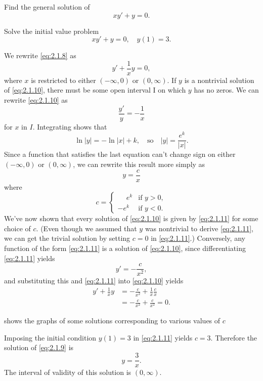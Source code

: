 \begin{example} \label{example:2.1.4}
\begin{alist}
\item %
Find the general solution of
\begin{equation}
 xy'+y=0.\label{eq:2.1.8}
\end{equation}

\item %
Solve the initial value problem
\begin{equation}
 xy'+y=0,\quad y(1)=3.\label{eq:2.1.9}
\end{equation}
\end{alist}
\end{example}


\begin{alistSolution}
\item
We rewrite \eqref{eq:2.1.8} as
\begin{equation}\label{eq:2.1.10}
y'+\frac{1}{x}y=0,
\end{equation}
where $x$ is restricted to either $(-\infty,0)$ or $(0,\infty)$. If
$y$ is a nontrivial solution of \eqref{eq:2.1.10}, there must be some
open interval I on which $y$ has no zeros. We can rewrite
\eqref{eq:2.1.10} as
\[
\frac{y'}{y}=-\frac{1}{x}
\]
for $x$ in $I$. Integrating shows that
\[
\ln|y|=-\ln|x|+k,\quad\text{so}\quad|y|=\frac{e^k}{|x|}.
\]
Since a function that satisfies the last equation can't change sign on
either $(-\infty,0)$ or $(0,\infty)$, we can rewrite this result more
simply as
\begin{equation}\label{eq:2.1.11}
y=\frac{c}{x}
\end{equation}
where
\[
c=
\begin{cases}
\phantom{-}e^k&\text{if } y>0,\\
-e^k&\text{if } y<0.
\end{cases}
\]
We've now shown that every solution of \eqref{eq:2.1.10} is given by
\eqref{eq:2.1.11} for some choice of $c$. (Even though we assumed that $y$
was nontrivial to derive \eqref{eq:2.1.11}, we can get the trivial
solution by setting $c=0$ in \eqref{eq:2.1.11}.) Conversely, any function
of the form \eqref{eq:2.1.11} is a solution of \eqref{eq:2.1.10}, since
differentiating \eqref{eq:2.1.11} yields
\[
y'=-\frac{c}{x^2},
\]
and substituting this and \eqref{eq:2.1.11} into  \eqref{eq:2.1.10} yields
\begin{align*}
y'+\frac{1}{x}y&=-\frac{c}{x^2}+\frac{1}{x}\frac{c}{x}\\
&=-\frac{c}{x^2}+\frac{c}{x^2}=0.
\end{align*}

 shows the graphs of some solutions corresponding
to various values of $c$


\item Imposing the initial condition $y(1)=3$ in
\eqref{eq:2.1.11} yields $c=3$. Therefore the solution of \eqref{eq:2.1.9} is
\[
y=\frac{3}{x}.
\]
The interval of validity of this solution is  $(0,\infty)$.
\end{alistSolution}

